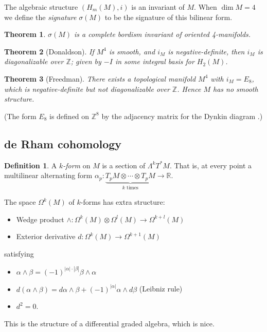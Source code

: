 \documentclass{article}
\newtheorem*{theorem}{Theorem}
\theoremstyle{definition}
\newtheorem*{definition}{Definition}
\newcommand{\Z}{\mathbb{Z}}
\newcommand{\R}{\mathbb{R}}
\begin{document}
The algebraic structure $(H_m(M),i)$ is an invariant of $M$. When $\dim M=4$ we
define the \emph{signature} $\sigma(M)$ to be the signature of this bilinear
form.

\begin{theorem}
    $\sigma(M)$ is a complete bordism invariant of oriented 4-manifolds.
\end{theorem}

\begin{theorem}[Donaldson]
    If $M^4$ is smooth, and $i_M$ is negative-definite, then $i_M$ is
    diagonalizable over $\Z$; given by $-I$ in some integral basis for $H_2(M)$.
\end{theorem}

\begin{theorem}[Freedman]
    There exists a topological manifold $M^4$ with $i_M=E_8$, which is
    negative-definite but not diagonalizable over $\Z$. Hence $M$ has no smooth
    structure.
\end{theorem}

(The form $E_8$ is defined on $\Z^8$ by the adjacency matrix for the Dynkin
diagram .)

\subsection*{de Rham cohomology}

\begin{definition}
    A \emph{$k$-form} on $M$ is a section of $\Lambda^kT^*M$. That is, at every
    point a multilinear alternating form
    $\alpha_p:\underbrace{T_pM\otimes\cdots\otimes T_pM}_{\text{$k$ times}}\to\R$.
\end{definition}

The space $\Omega^k(M)$ of $k$-forms has extra structure:
\begin{itemize}
    \item Wedge product $\wedge:\Omega^k(M)\otimes\Omega^l(M)\to\Omega^{k+l}(M)$
    \item Exterior derivative $d:\Omega^k(M)\to\Omega^{k+1}(M)$
\end{itemize}
satisfying
\begin{itemize}
    \item $\alpha\wedge\beta=(-1)^{|\alpha|\cdot|\beta|}\beta\wedge\alpha$
    \item $d(\alpha\wedge\beta)
        = d\alpha\wedge\beta+(-1)^{|\alpha|}\alpha\wedge d\beta$ (Leibniz rule)
    \item $d^2=0$.
\end{itemize}
This is the structure of a differential graded algebra, which is nice.
\end{document}
